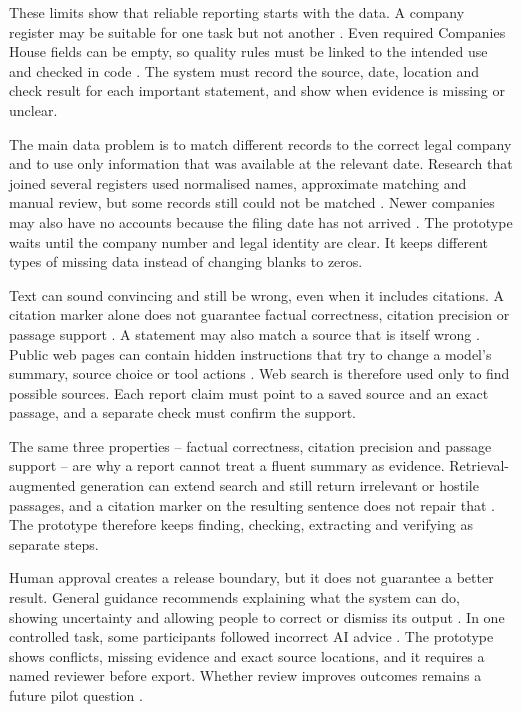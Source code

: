 These limits show that reliable reporting starts with the data. A company register may be suitable
for one task but not another \citep{krasikov2020ready}. Even required Companies House fields can be
empty, so quality rules must be linked to the intended use and checked in code
\citep{nikiforova2020quality}. The system must record the source, date, location and check result for
each important statement, and show when evidence is missing or unclear.

The main data problem is to match different records to the correct legal company and to use only
information that was available at the relevant date. Research that joined several registers used
normalised names, approximate matching and manual review, but some records still could not be matched
\citep{surak2026gateways}. Newer companies may also have no accounts because the filing date has not
arrived \citep{hardman2023small}. The prototype waits until the company number and legal identity are
clear. It keeps different types of missing data instead of changing blanks to zeros.

Text can sound convincing and still be wrong, even when it includes citations. A citation marker
alone does not guarantee factual correctness, citation precision or passage support
\citep{gao2023alce}. A statement may also match a source that is itself wrong \citep{gao2023rarr}.
Public web pages can contain hidden instructions that try to change a model's summary, source choice
or tool actions \citep{greshake2023indirect}. Web search is therefore used only to find possible
sources. Each report claim must point to a saved source and an exact passage, and a separate check
must confirm the support.

The same three properties -- factual correctness, citation precision and passage support -- are why
a report cannot treat a fluent summary as evidence. Retrieval-augmented generation can extend search
and still return irrelevant or hostile passages, and a citation marker on the resulting sentence
does not repair that \citep{gao2023ragsurvey,gao2023alce}. The prototype therefore keeps finding,
checking, extracting and verifying as separate steps.

Human approval creates a release boundary, but it does not guarantee a better result. General
guidance recommends explaining what the system can do, showing uncertainty and allowing people to
correct or dismiss its output \citep{amershi2019guidelines}. In one controlled task, some participants
followed incorrect AI advice \citep{bucinca2021forcing}. The prototype shows conflicts, missing
evidence and exact source locations, and it requires a named reviewer before export. Whether review
improves outcomes remains a future pilot question
\citep{amershi2019guidelines,bucinca2021forcing}.

